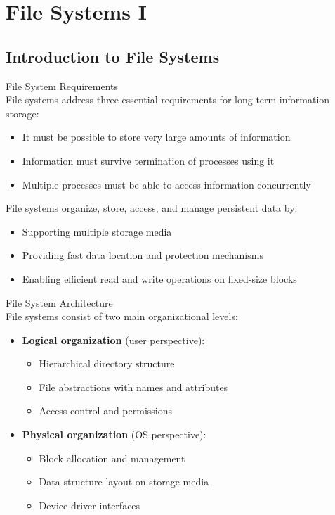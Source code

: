 \section{File Systems I}

\subsection{Introduction to File Systems}

\begin{concept}{File System Requirements}\\
    File systems address three essential requirements for long-term information storage:
    \begin{itemize}
        \item It must be possible to store very large amounts of information
        \item Information must survive termination of processes using it
        \item Multiple processes must be able to access information concurrently
    \end{itemize}
    
    File systems organize, store, access, and manage persistent data by:
    \begin{itemize}
        \item Supporting multiple storage media
        \item Providing fast data location and protection mechanisms
        \item Enabling efficient read and write operations on fixed-size blocks
    \end{itemize}
\end{concept}

\begin{definition}{File System Architecture}\\
    File systems consist of two main organizational levels:
    \begin{itemize}
        \item \textbf{Logical organization} (user perspective):
            \begin{itemize}
                \item Hierarchical directory structure
                \item File abstractions with names and attributes
                \item Access control and permissions
            \end{itemize}
        \item \textbf{Physical organization} (OS perspective):
            \begin{itemize}
                \item Block allocation and management
                \item Data structure layout on storage media
                \item Device driver interfaces
            \end{itemize}
    \end{itemize}
\end{definition}

